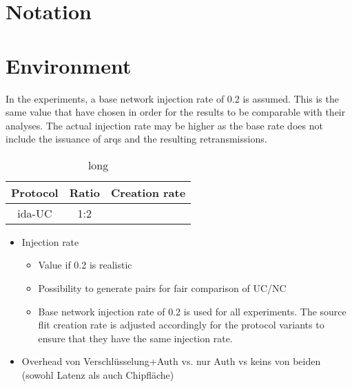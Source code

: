 \section{Notation}

\section{Environment}
In the experiments, a base network injection rate of 0.2 is assumed. This is the same value that \citeauthor{moriam18activeattackers} have chosen
\cite[2]{moriam18activeattackers} in order for the results to be comparable with their analyses. The actual injection rate may be higher as the base rate does not include the
issuance of \glspl{arq} and the resulting retransmissions.

\begin{table}
    \centering
    \begin{tabulary}{\textwidth}{C|C|C}
        Protocol & Ratio & Creation rate \\\hline
        \gls{ida}-UC & 1:2 & \\
    \end{tabulary}
    \caption[short]{long}
    \label{tab:creationrates}
\end{table}

\begin{itemize}
    \item Injection rate
        \begin{itemize}
            \item Value if 0.2 is realistic
            \item Possibility to generate pairs for fair comparison of UC/NC
            \item Base network injection rate of 0.2 is used for all experiments. The source flit creation rate is adjusted accordingly for the
                protocol variants to ensure that they have the same injection rate.
        \end{itemize}
    \item Overhead von Verschlüsselung+Auth vs. nur Auth vs keins von beiden (sowohl Latenz als auch Chipfläche)
\end{itemize}

